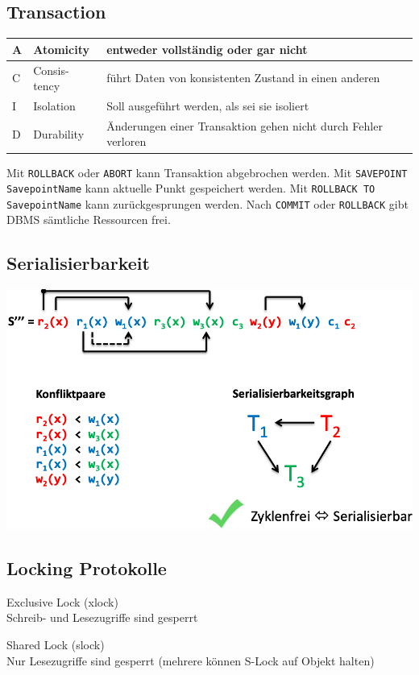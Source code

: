 \documentclass[10pt,landscape,a4paper]{scrartcl}
\newcommand{\drule}[3][0]{%
	\tikz[baseline]{\path[decoration={markings,
			mark=between positions 0 and 1 step 2*#3
			with {\node[fill, circle, minimum width=#3, inner sep=0pt, anchor=south west] {};}},postaction={decorate}]  (0,#1) -- ++(#2,0);}}
\begin{document}
\begin{multicols*}{5}
\section{Transaction}
\begin{tabular}{p{.1cm} | p{1.1cm} | p{3.2cm} }
	A&Atomicity&entweder vollständig oder gar nicht\\
	\hline
	C&Consis-tency&führt Daten von konsistenten Zustand in einen anderen\\
	\hline
	I&Isolation&Soll ausgeführt werden, als sei sie isoliert\\
	\hline
	D&Durability&Änderungen einer Transaktion gehen nicht durch Fehler verloren\\
\end{tabular}
\drule{5.5cm}{1pt}
	Mit \textcolor{b}{\texttt{ROLLBACK}} oder \textcolor{b}{\texttt{ABORT}} kann Transaktion abgebrochen werden. Mit \textcolor{b}{\texttt{SAVEPOINT SavepointName}} kann aktuelle Punkt gespeichert werden. Mit \textcolor{b}{\texttt{ROLLBACK TO SavepointName}} kann zurückgesprungen werden. Nach \textcolor{b}{\texttt{COMMIT}} oder \textcolor{b}{\texttt{ROLLBACK}} gibt DBMS sämtliche Ressourcen frei.
\subsection{Serialisierbarkeit}

\begin{center}
	\includegraphics[scale=.3]{Graphic/serialisierbarkeitsgraf2}
\end{center}
\vspace{-10pt}
\subsection{Locking Protokolle}
\begin{compactitem} [$\bullet$]
	\item \textcolor{b}{Exclusive Lock (xlock)}\\
	Schreib- und Lesezugriffe sind gesperrt
	\item \textcolor{b}{Shared Lock (slock)}\\
	Nur Lesezugriffe sind gesperrt (mehrere können S-Lock auf Objekt halten)
\end{compactitem}

\end{multicols*}
\end{document}
